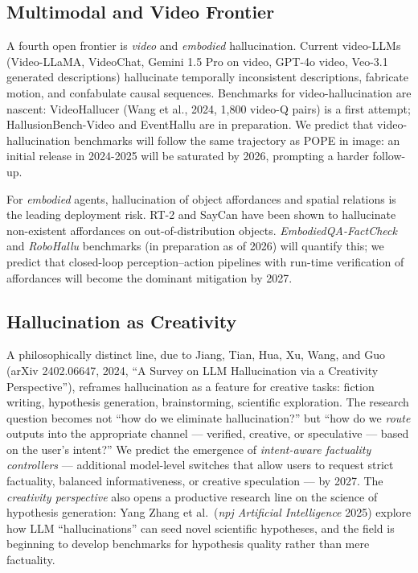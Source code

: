 \documentclass{article}
\begin{document}
\subsection{Multimodal and Video Frontier}\label{multimodal-and-video-frontier}

A fourth open frontier is \emph{video} and \emph{embodied} hallucination. Current video-LLMs (Video-LLaMA, VideoChat, Gemini 1.5 Pro on video, GPT-4o video, Veo-3.1 generated descriptions) hallucinate temporally inconsistent descriptions, fabricate motion, and confabulate causal sequences. Benchmarks for video-hallucination are nascent: VideoHallucer (Wang et al., 2024, 1,800 video-Q pairs) is a first attempt; HallusionBench-Video and EventHallu are in preparation. We predict that video-hallucination benchmarks will follow the same trajectory as POPE in image: an initial release in 2024-2025 will be saturated by 2026, prompting a harder follow-up.

For \emph{embodied} agents, hallucination of object affordances and spatial relations is the leading deployment risk. RT-2 and SayCan have been shown to hallucinate non-existent affordances on out-of-distribution objects. \emph{EmbodiedQA-FactCheck} and \emph{RoboHallu} benchmarks (in preparation as of 2026) will quantify this; we predict that closed-loop perception--action pipelines with run-time verification of affordances will become the dominant mitigation by 2027.

\subsection{Hallucination as Creativity}\label{hallucination-as-creativity}

A philosophically distinct line, due to Jiang, Tian, Hua, Xu, Wang, and Guo (arXiv 2402.06647, 2024, ``A Survey on LLM Hallucination via a Creativity Perspective''), reframes hallucination as a feature for creative tasks: fiction writing, hypothesis generation, brainstorming, scientific exploration. The research question becomes not ``how do we eliminate hallucination?'' but ``how do we \emph{route} outputs into the appropriate channel --- verified, creative, or speculative --- based on the user's intent?'' We predict the emergence of \emph{intent-aware factuality controllers} --- additional model-level switches that allow users to request strict factuality, balanced informativeness, or creative speculation --- by 2027. The \emph{creativity perspective} also opens a productive research line on the science of hypothesis generation: Yang Zhang et al.~(\emph{npj Artificial Intelligence} 2025) explore how LLM ``hallucinations'' can seed novel scientific hypotheses, and the field is beginning to develop benchmarks for hypothesis quality rather than mere factuality.
\end{document}
